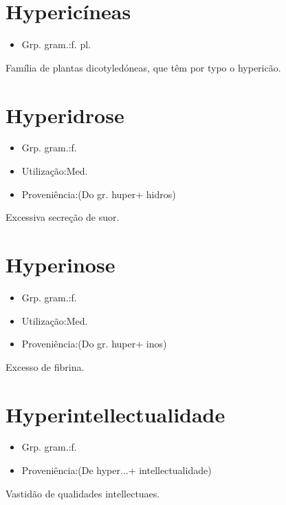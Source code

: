 \documentclass{article}
\begin{document}
\section{Hypericíneas}
\begin{itemize}
\item {Grp. gram.:f. pl.}
\end{itemize}
Família de plantas dicotyledóneas, que têm por typo o hypericão.
\section{Hyperidrose}
\begin{itemize}
\item {Grp. gram.:f.}
\end{itemize}
\begin{itemize}
\item {Utilização:Med.}
\end{itemize}
\begin{itemize}
\item {Proveniência:(Do gr. \textunderscore huper\textunderscore  + \textunderscore hidros\textunderscore )}
\end{itemize}
Excessiva secreção de suor.
\section{Hyperinose}
\begin{itemize}
\item {Grp. gram.:f.}
\end{itemize}
\begin{itemize}
\item {Utilização:Med.}
\end{itemize}
\begin{itemize}
\item {Proveniência:(Do gr. \textunderscore huper\textunderscore  + \textunderscore inos\textunderscore )}
\end{itemize}
Excesso de fibrina.
\section{Hyperintellectualidade}
\begin{itemize}
\item {Grp. gram.:f.}
\end{itemize}
\begin{itemize}
\item {Proveniência:(De \textunderscore hyper...\textunderscore  + \textunderscore intellectualidade\textunderscore )}
\end{itemize}
Vastidão de qualidades intellectuaes.
\end{document}
